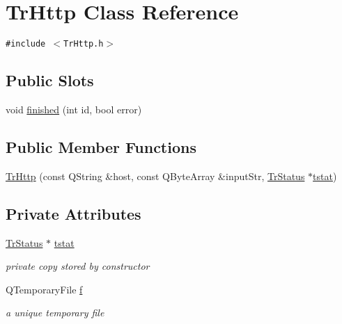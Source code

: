 \hypertarget{classTrHttp}{
\section{TrHttp Class Reference}
\label{classTrHttp}
}
{\tt \#include $<$TrHttp.h$>$}

\subsection*{Public Slots}
\begin{CompactItemize}
\item 
void \hyperlink{classTrHttp_a1a518e5b0ba5501345888512a74199c}{finished} (int id, bool error)
\end{CompactItemize}
\subsection*{Public Member Functions}
\begin{CompactItemize}
\item 
\hyperlink{classTrHttp_9ec9dba1353faa4c18ed4da5a15b2e6b}{TrHttp} (const QString \&host, const QByteArray \&inputStr, \hyperlink{classTrStatus}{TrStatus} $\ast$\hyperlink{classTrHttp_235af2bb91baf44b474fab17efdb4b06}{tstat})
\end{CompactItemize}
\subsection*{Private Attributes}
\begin{CompactItemize}
\item 
\hypertarget{classTrHttp_235af2bb91baf44b474fab17efdb4b06}{
\hyperlink{classTrStatus}{TrStatus} $\ast$ \hyperlink{classTrHttp_235af2bb91baf44b474fab17efdb4b06}{tstat}}
\label{classTrHttp_235af2bb91baf44b474fab17efdb4b06}

\begin{CompactList}\small\item\em private copy stored by constructor \item\end{CompactList}\item 
\hypertarget{classTrHttp_da41b756e7180ebe6638c8559bf63df8}{
QTemporaryFile \hyperlink{classTrHttp_da41b756e7180ebe6638c8559bf63df8}{f}}
\label{classTrHttp_da41b756e7180ebe6638c8559bf63df8}

\begin{CompactList}\small\item\em a unique temporary file \item\end{CompactList}\end{CompactItemize}


